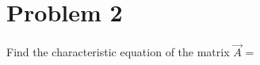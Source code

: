 \documentclass[journal,12pt,twocolumn]{IEEEtran}
\begin{document}
\begin{comment}
\implies\vec{A^2}\cdot(\vec{A}-6\vec{I})&=\myvec{5&2&8\\0&4&0\\8&5&13}\myvec{-5&0&2\\0&-4&1\\2&0&-3}\\
\implies\vec{A^2}\cdot(\vec{A}-6\vec{I})&=\myvec{-9&0&-14\\0&-16&-7\\-14&0&-23}\label{eq4}
\end{align}
Next we compute $7\vec{A}+2\vec{I}$ as follows
\begin{align}
7\vec{A}+2\vec{I} &= 7\myvec{1&0&2\\0&2&1\\2&0&3}+2\myvec{1&0&0\\0&1&0\\0&0&1}\\
\implies7\vec{A}+2\vec{I}&=\myvec{9&0&14\\0&16&7\\14&0&23}\label{eq5}
\end{align}
Now putting the value of $\vec{A^2}(\vec{A}-6\vec{I})$ from equation \ref{eq4} and value of $7\vec{A}+2\vec{I}$ from equation \ref{eq5} into the left hand side of equation \ref{eq1} we get
\begin{align}\textwidth
\vec{A^2}(\vec{A^}-6\vec{I})+7\vec{A}+2\vec{I}&=\myvec{0&0&0\\0&0&0\\0&0&0}\\
\implies\vec{A^2}(\vec{A^}-6\vec{I})+7\vec{A}+2\vec{I}&=0\label{eqF}
\end{align}
Thus from equation \ref{eqF} we arrive at the right hand side of equation \ref{eq1}, Hence proved.
\end{comment}
\section{Problem 2}
Find the characteristic equation of the matrix $\vec{A}$ = 
\end{document}
